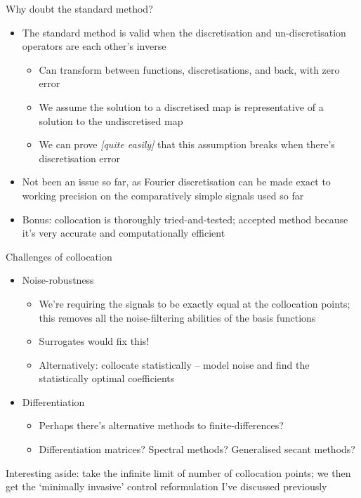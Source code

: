 \documentclass[presentation]{beamer}
\begin{document}
\begin{frame}[label={sec:org0e502da}]{Why doubt the standard method?}
\begin{itemize}
\item The standard method is valid when the discretisation and un-discretisation operators are each other's inverse
\begin{itemize}
\item Can transform between functions, discretisations, and back, with zero error
\item We assume the solution to a discretised map is representative of a solution to the undiscretised map
\item We can prove \emph{[quite easily]} that this assumption breaks when there's discretisation error
\end{itemize}
\end{itemize}
\vfill
\begin{itemize}
\item Not been an issue so far, as Fourier discretisation can be made exact to working precision on the comparatively simple signals used so far
\end{itemize}
\vfill
\begin{itemize}
\item Bonus: collocation is thoroughly tried-and-tested; accepted method because it's very accurate and computationally efficient
\end{itemize}
\end{frame}

\begin{frame}[label={sec:org90522b3}]{Challenges of collocation}
\begin{itemize}
\item Noise-robustness
\begin{itemize}
\item We're requiring the signals to be exactly equal at the collocation points; this removes all the noise-filtering abilities of the basis functions
\item Surrogates would fix this!
\item Alternatively: collocate statistically -- model noise and find the statistically optimal coefficients
\end{itemize}
\end{itemize}
\vfill
\begin{itemize}
\item Differentiation
\begin{itemize}
\item Perhaps there's alternative methods to finite-differences?
\item Differentiation matrices? Spectral methods? Generalised secant methods?
\end{itemize}
\end{itemize}
\vfill
Interesting aside: take the infinite limit of number of collocation points; we then get the `minimally invasive' control reformulation I've discussed previously
\end{frame}
\end{document}
